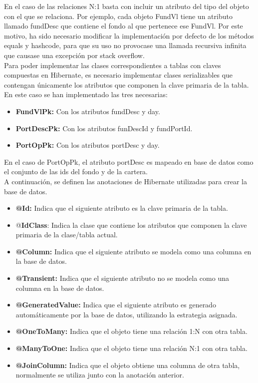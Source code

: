 \documentclass[12pt, a4paper]{article}
\begin{document}
\newpage

En el caso de las relaciones N:1 basta con incluir un atributo del tipo del objeto con el que se relaciona. Por ejemplo, cada objeto FundVl tiene un atributo llamado fundDesc que contiene el fondo al que pertenece ese FundVl. Por este motivo, ha sido necesario modificar la implementación por defecto de los métodos equals y hashcode, para que su uso no provocase una llamada recursiva infinita que causase una excepción por stack overflow.\\


Para poder implementar las clases correspondientes a tablas con claves compuestas en Hibernate, es necesario implementar clases serializables que contengan únicamente los atributos que componen la clave primaria de la tabla. En este caso se han implementado las tres necesarias: %

\begin{itemize}
	\item \textbf{FundVlPk:} Con los atributos fundDesc y day.
	\item \textbf{PortDescPk:} Con los atributos funDescId y fundPortId.
	\item \textbf{PortOpPk:} Con los atributos portDesc y day.
\end{itemize}

En el caso de PortOpPk, el atributo portDesc es mapeado en base de datos como el conjunto de las ids del fondo y de la cartera.\\

A continuación, se definen las anotaciones de Hibernate utilizadas para crear la base de datos.

\begin{itemize}
	\item \textbf{@Id:} Indica que el siguiente atributo es la clave primaria de la tabla.
	\item @\textbf{IdClass}: Indica la clase que contiene los atributos que componen la clave primaria de la clase/tabla actual.
	\item  \textbf{@Column:} Indica que el siguiente atributo se modela como una columna en la base de datos.
	\item  \textbf{@Transient:} Indica que el siguiente atributo no se modela como una columna en la base de datos.
	\item \textbf{@GeneratedValue:} Indica que el siguiente atributo es generado automáticamente por la base de datos, utilizando la estrategia asignada.
	\item \textbf{@OneToMany:} Indica que el objeto tiene una relación 1:N con otra tabla.
	\item\textbf{@ManyToOne:} Indica que el objeto tiene una relación N:1 con otra tabla.
	\item\textbf{@JoinColumn:} Indica que el objeto obtiene una columna de otra tabla, normalmente se utiliza junto con la anotación anterior.\\
\end{itemize}
\end{document}
